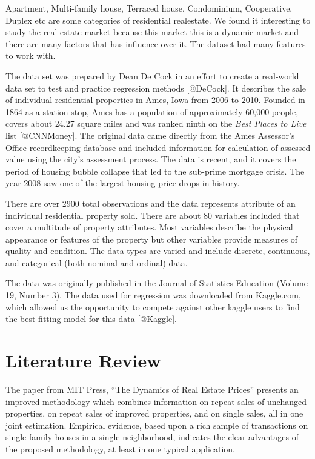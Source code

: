 \documentclass[
]{article}
\begin{document}
Apartment, Multi-family house, Terraced house, Condominium, Cooperative,
Duplex etc are some categories of residential realestate. We found it
interesting to study the real-estate market because this market this is
a dynamic market and there are many factors that has influence over it.
The dataset had many features to work with.

The data set was prepared by Dean De Cock in an effort to create a
real-world data set to test and practice regression methods
{[}@DeCock{]}. It describes the sale of individual residential
properties in Ames, Iowa from 2006 to 2010. Founded in 1864 as a station
stop, Ames has a population of approximately 60,000 people, covers about
24.27 square miles and was ranked ninth on the \emph{Best Places to
Live} list {[}@CNNMoney{]}. The original data came directly from the
Ames Assessor's Office recordkeeping database and included information
for calculation of assessed value using the city's assessment process.
The data is recent, and it covers the period of housing bubble collapse
that led to the sub-prime mortgage crisis. The year 2008 saw one of the
largest housing price drops in history.

There are over 2900 total observations and the data represents attribute
of an individual residential property sold. There are about 80 variables
included that cover a multitude of property attributes. Most variables
describe the physical appearance or features of the property but other
variables provide measures of quality and condition. The data types are
varied and include discrete, continuous, and categorical (both nominal
and ordinal) data.

The data was originally published in the Journal of Statistics Education
(Volume 19, Number 3). The data used for regression was downloaded from
Kaggle.com, which allowed us the opportunity to compete against other
kaggle users to find the best-fitting model for this data {[}@Kaggle{]}.

\hypertarget{literature-review}{%
\section{Literature Review}\label{literature-review}}

The paper from MIT Press, ``The Dynamics of Real Estate Prices''
presents an improved methodology which combines information on repeat
sales of unchanged properties, on repeat sales of improved properties,
and on single sales, all in one joint estimation. Empirical evidence,
based upon a rich sample of transactions on single family houses in a
single neighborhood, indicates the clear advantages of the proposed
methodology, at least in one typical application.
\end{document}
